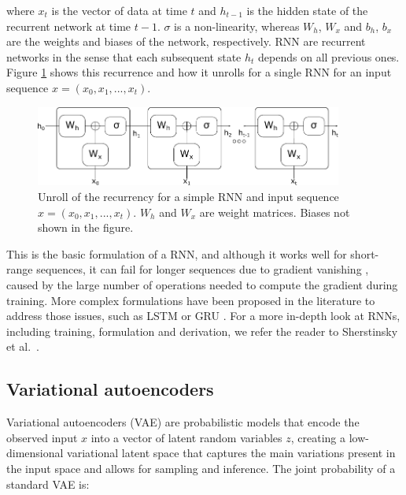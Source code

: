 where $x_t$ is the vector of data at time $t$ and $h_{t-1}$ is the hidden state of the recurrent network at time $t-1$. $\sigma$ is a non-linearity, whereas $W_h$, $W_x$ and $b_h$, $b_x$ are the weights and biases of the network, respectively. RNN are recurrent networks in the sense that each subsequent state $h_t$ depends on all previous ones. Figure \ref{fig:rnnvae:rnn} shows this recurrence and how it unrolls for a single RNN for an input sequence $x = (x_0,x_1, ..., x_t)$. \\

\begin{figure}[!htbp]
  \centering
  \includegraphics[width=0.9\textwidth]{figures/rnnvae/rnn-fig.pdf}
  \caption[Unroll of the recurrency for a basic RNN.]{Unroll of the recurrency for a simple RNN and input sequence $x = (x_0,x_1, ..., x_t)$. $W_h$ and $W_x$ are weight matrices. Biases not shown in the figure.}\label{fig:rnnvae:rnn}
\end{figure}

This is the basic formulation of a RNN, and although it works well for short-range sequences, it can fail for longer sequences due to gradient vanishing \cite{Hochreiter1998}, caused by the large number of operations needed to compute the gradient during training. More complex formulations have been proposed in the literature to address those issues, such as LSTM \cite{Hochreiter1997} or GRU \cite{Chung2014}. For a more in-depth look at RNNs, including training, formulation and derivation, we refer the reader to Sherstinsky et al.\ \cite{Sherstinsky2020}.  \\

\subsection{Variational autoencoders}

Variational autoencoders (VAE) are probabilistic models that encode the observed input $x$ into a vector of latent random variables $z$, creating a low-dimensional variational latent space that captures the main variations present in the input space and allows for sampling and inference. The joint probability of a standard VAE is:

